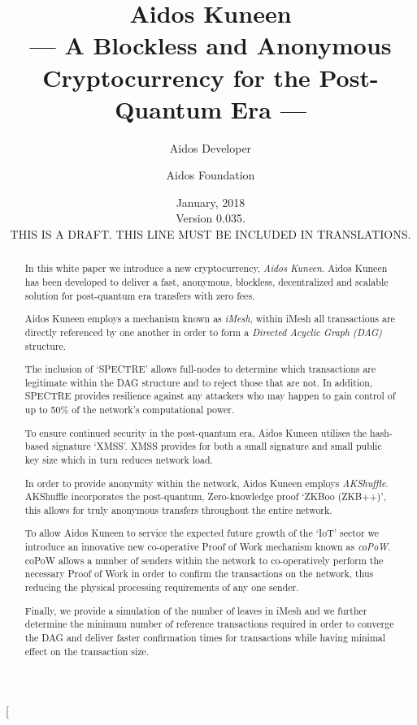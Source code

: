 \documentclass[a4paper,10pt,twocolumn]{article}
\title{Aidos Kuneen \\ --- A Blockless and Anonymous Cryptocurrency for the Post-Quantum Era ---}
\author{
	Aidos Developer \and Aidos Foundation
}
\date{January, 2018 \\ Version 0.035.\\ THIS IS A DRAFT. THIS LINE MUST BE INCLUDED IN TRANSLATIONS.}
\begin{document}
\twocolumn[
	\maketitle

\begin{abstract}
		In this white paper we introduce a new cryptocurrency, \emph{Aidos Kuneen}. Aidos Kuneen has been developed to deliver a 
		fast, anonymous, blockless, decentralized and scalable solution for post-quantum era transfers with zero fees. 
		
		Aidos Kuneen employs a mechanism known as \emph{iMesh}, within iMesh all transactions are directly referenced by
		one another in order to form a \emph{Directed Acyclic Graph (DAG)} structure.
		
		The inclusion of `SPECTRE' allows full-nodes to determine which transactions are legitimate within the DAG structure and
		to reject those that are not. In addition, SPECTRE provides resilience against any attackers who may happen to gain 
		control of up to 50\% of the network's computational power.
		
		To ensure continued security in the post-quantum era, Aidos Kuneen utilises the hash-based signature `XMSS'. XMSS
		provides for both a small signature and small public key size which in turn reduces network load.
	
		In order to provide anonymity within the network, Aidos Kuneen employs \emph{AKShuffle}. AKShuffle 	
		incorporates the post-quantum, Zero-knowledge proof `ZKBoo (ZKB++)', this allows for truly anonymous transfers 
		throughout the entire network.
		
		To allow Aidos Kuneen to service the expected future growth of the `IoT' sector we introduce an innovative new 
		co-operative Proof of Work mechanism known as \emph{coPoW}. coPoW allows a number of senders within the network to 
		co-operatively perform the necessary Proof of Work in order to confirm the transactions on the network, thus reducing 
		the physical processing requirements of any one sender.
		
		Finally, we provide a simulation of the number of leaves in iMesh and we further determine the minimum number of 
		reference transactions required in order to converge the DAG and deliver faster confirmation times for transactions 
		while having minimal effect on the transaction size.
		
		\end{abstract}

		\vspace{0.5cm}
\end{document}
